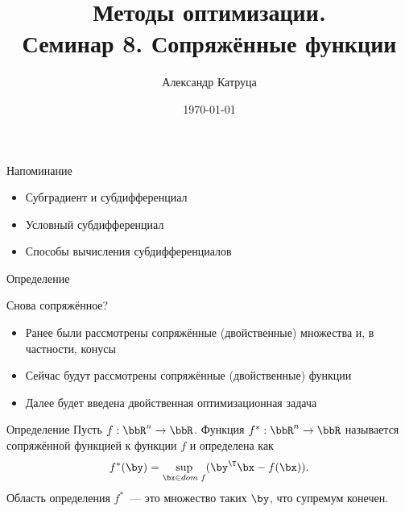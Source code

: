 \documentclass[12pt]{beamer}
\title[Семинар 8]{Методы оптимизации. \\
 Семинар 8. Сопряжённые функции}
\author{Александр Катруца}
\institute{Московский физико-технический институт,\\
Факультет Управления и Прикладной Математики}
\date{\today}
\begin{document}
\begin{frame}
\maketitle
\end{frame}

\begin{frame}{Напоминание}
\begin{itemize}
\item Субградиент и субдифференциал
\item Условный субдифференциал
\item Способы вычисления субдифференциалов
\end{itemize}
\end{frame}

\begin{frame}{Определение}
\begin{block}{Снова сопряжённое?}
\begin{itemize}
\item Ранее были рассмотрены сопряжённые (двойственные) множества и, в частности, конусы
\item Сейчас будут рассмотрены сопряжённые (двойственные) функции
\item Далее будет введена двойственная оптимизационная задача 
\end{itemize}
\end{block}

\begin{block}{Определение}
Пусть $f: \bbR^n \rightarrow \bbR$. 
Функция $f^*: \bbR^n \rightarrow \bbR$ называется сопряжённой функцией к функции $f$ и определена как
\vspace{-4mm}
\[
f^*(\by) = \sup\limits_{\bx \in dom \; f} (\by^{\T}\bx - f(\bx)).
\vspace{-3mm}
\]
Область определения $f^*$~--- это множество таких $\by$, что супремум конечен. 

\end{block}
\end{frame}
\end{document}
